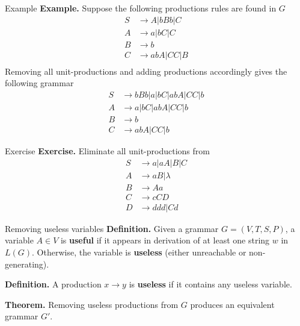 \documentclass[10pt]{beamer}
\begin{document}
\begin{frame}{Example}
    \textbf{Example.} Suppose the following productions rules are found in $G$
    \begin{align*}
        S & \rightarrow A | bBb | C  \\
        A & \rightarrow a | bC | C   \\
        B & \rightarrow b            \\
        C & \rightarrow abA | CC | B \\
    \end{align*}
    Removing all unit-productions and adding productions accordingly gives the following grammar
    \begin{align*}
        S & \rightarrow bBb | a | bC | abA | CC | b \\
        A & \rightarrow a | bC | abA | CC | b       \\
        B & \rightarrow b                           \\
        C & \rightarrow abA | CC | b
    \end{align*}
\end{frame}

\begin{frame}[t]{Exercise}
    \textbf{Exercise.} Eliminate all unit-productions from
    \begin{align*}
        S & \rightarrow a| aA | B | C \\
        A & \rightarrow aB | \lambda  \\
        B & \rightarrow Aa            \\
        C & \rightarrow cCD           \\
        D & \rightarrow ddd| Cd
    \end{align*}
\end{frame}

\begin{frame}{Removing useless variables}
    \textbf{Definition.} Given a grammar $G = (V, T, S, P)$, a variable $A \in V$ is \textbf{useful} if it appears in derivation of at least one string $w$ in $L(G)$. Otherwise, the variable is \textbf{useless} (either unreachable or non-generating).

    \textbf{Definition.} A production $x \rightarrow y$ is \textbf{useless} if it contains any useless variable.

    \textbf{Theorem.} Removing useless productions from $G$ produces an equivalent grammar $G'$.

\end{frame}
\end{document}

